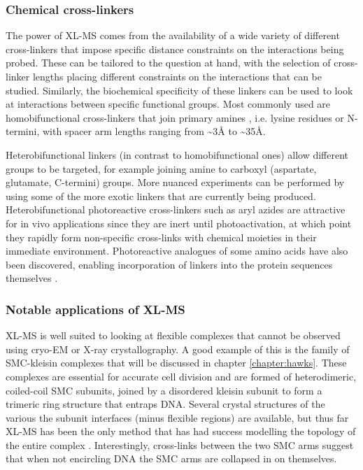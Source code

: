\documentclass[a4paper,11pt,twoside,openright]{scrbook}
\begin{document}
\subsubsection{Chemical cross-linkers}
The power of XL-MS comes from the availability of a wide variety of different
cross-linkers that impose specific distance constraints on the interactions
being probed. These can be tailored to the question at hand, with the selection
of cross-linker lengths placing different constraints on the interactions that
can be studied. Similarly, the biochemical specificity of these linkers can be
used to look at interactions between specific functional groups. Most commonly
used are homobifunctional cross-linkers that join primary amines
\cite{Leitner2016}, i.e. lysine residues or N-termini, with spacer arm lengths
ranging from \textasciitilde 3Å to \textasciitilde 35Å.

Heterobifunctional linkers (in contrast to homobifunctional ones) allow
different groups to be targeted, for example joining amine to carboxyl
(aspartate, glutamate, C-termini) groups. More nuanced experiments can be
performed by using some of the more exotic linkers that are currently being
produced. Heterobifunctional photoreactive cross-linkers such as aryl azides are
attractive for in vivo applications since they are inert until photoactivation,
at which point they rapidly form non-specific cross-links with chemical moieties
in their immediate environment. Photoreactive analogues of some amino acids have
also been discovered, enabling incorporation of linkers into the protein
sequences themselves \cite{Suchanek2005}.


\subsubsection{Notable applications of XL-MS}
XL-MS is well suited to looking at flexible complexes that cannot be observed
using cryo-EM or X-ray crystallography. A good example of this is the family of
SMC-kleisin complexes that will be discussed in chapter \ref{chapter:hawks}.
These complexes are essential for accurate cell division and are formed of
heterodimeric, coiled-coil SMC subunits, joined by a disordered kleisin subunit
to form a trimeric ring structure that entraps DNA. Several crystal structures
of the various the subunit interfaces (minus flexible regions) are available,
but thus far XL-MS has been the only method that has had success modelling the
topology of the entire complex \cite{Barysz2015}. Interestingly, cross-links
between the two SMC arms suggest that when not encircling DNA the SMC arms are
collapsed in on themselves.
\end{document}
